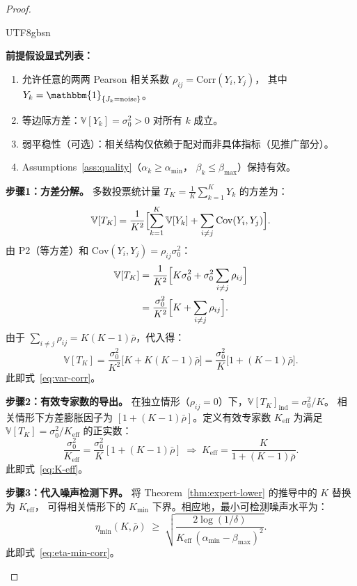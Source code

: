 \documentclass[12pt,a4paper]{article}
\newenvironment{chinese}{\begin{CJK}{UTF8}{gbsn}}{\end{CJK}}
\newcommand{\V}{\mathbb{V}}
\newcommand{\etamin}{\eta_{\min}}
\newcommand{\rhobar}{\bar{\rho}}
\begin{document}
\begin{proof}
\begin{chinese}

\textbf{前提假设显式列表：}
\begin{enumerate}[label=(\textbf{P\arabic*})]
    \item 允许任意的两两 Pearson 相关系数 $\rho_{ij} = \mathrm{Corr}(Y_i,Y_j)$，
          其中 $Y_k = \mathbbm{1}_{\{J_k=\mathrm{noise}\}}$。
    \item 等边际方差：$\V[Y_k] = \sigma_0^{2} > 0$ 对所有 $k$ 成立。
    \item 弱平稳性（可选）：相关结构仅依赖于配对而非具体指标（见推广部分）。
    \item Assumptions~\ref{ass:quality}（$\alpha_k\geq\alpha_{\min}$，
          $\beta_k\leq\beta_{\max}$）保持有效。
\end{enumerate}

\textbf{步骤1：方差分解。}
多数投票统计量 $T_K = \frac{1}{K}\sum_{k=1}^{K} Y_k$ 的方差为：
\[
\V[T_K] = \frac{1}{K^{2}}\Bigl[\sum_{k=1}^{K}\V[Y_k] + \sum_{i\neq j}\mathrm{Cov}(Y_i,Y_j)\Bigr].
\]
由 P2（等方差）和 $\mathrm{Cov}(Y_i,Y_j)=\rho_{ij}\sigma_0^{2}$：
\begin{align*}
    \V[T_K]
    &= \frac{1}{K^{2}}\Bigl[K\sigma_0^{2} + \sigma_0^{2}\sum_{i\neq j}\rho_{ij}\Bigr] \\
    &= \frac{\sigma_0^{2}}{K^{2}}\Bigl[K + \sum_{i\neq j}\rho_{ij}\Bigr].
\end{align*}
由于 $\sum_{i\neq j}\rho_{ij} = K(K-1)\rhobar$，代入得：
\[
\V[T_K] = \frac{\sigma_0^{2}}{K^{2}}\bigl[K + K(K-1)\rhobar\bigr]
= \frac{\sigma_0^{2}}{K}\bigl[1 + (K-1)\rhobar\bigr].
\]
此即式~\eqref{eq:var-corr}。

\textbf{步骤2：有效专家数的导出。}
在独立情形（$\rho_{ij}=0$）下，$\V[T_K]_{\mathrm{ind}} = \sigma_0^{2}/K$。
相关情形下方差膨胀因子为 $[1+(K-1)\rhobar]$。定义有效专家数 $K_{\mathrm{eff}}$
为满足 $\V[T_K] = \sigma_0^{2}/K_{\mathrm{eff}}$ 的正实数：
\[
\frac{\sigma_0^{2}}{K_{\mathrm{eff}}} = \frac{\sigma_0^{2}}{K}[1+(K-1)\rhobar]
\;\Longrightarrow\; K_{\mathrm{eff}} = \frac{K}{1+(K-1)\rhobar}.
\]
此即式~\eqref{eq:K-eff}。

\textbf{步骤3：代入噪声检测下界。}
将 Theorem~\ref{thm:expert-lower} 的推导中的 $K$ 替换为 $K_{\mathrm{eff}}$，
可得相关情形下的 $K_{\min}$ 下界。相应地，最小可检测噪声水平为：
\[
\etamin(K,\rhobar) \;\geq\;
\sqrt{\frac{2\log(1/\delta)}{K_{\mathrm{eff}}\,(\alpha_{\min}-\beta_{\max})^{2}}}.
\]
此即式~\eqref{eq:eta-min-corr}。


\end{chinese}
\end{proof}
\end{document}
